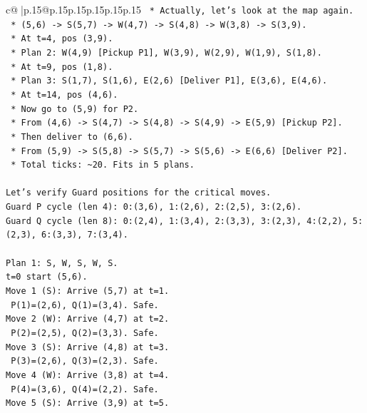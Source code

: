\documentclass{article}
\begin{document}
{\begin{supertabular}{c@{$\;$}|p{.15\linewidth}@{}p{.15\linewidth}p{.15\linewidth}p{.15\linewidth}p{.15\linewidth}p{.15\linewidth}}
{{{\texttt{    *   Actually, let's look at the map again.} \\
\texttt{    *   (5,6) {-}> S(5,7) {-}> W(4,7) {-}> S(4,8) {-}> W(3,8) {-}> S(3,9).} \\
\texttt{    *   At t=4, pos (3,9).} \\
\texttt{    *   Plan 2: W(4,9) {[}Pickup P1{]}, W(3,9), W(2,9), W(1,9), S(1,8).} \\
\texttt{    *   At t=9, pos (1,8).} \\
\texttt{    *   Plan 3: S(1,7), S(1,6), E(2,6) {[}Deliver P1{]}, E(3,6), E(4,6).} \\
\texttt{    *   At t=14, pos (4,6).} \\
\texttt{    *   Now go to (5,9) for P2.} \\
\texttt{    *   From (4,6) {-}> S(4,7) {-}> S(4,8) {-}> S(4,9) {-}> E(5,9) {[}Pickup P2{]}.} \\
\texttt{    *   Then deliver to (6,6).} \\
\texttt{    *   From (5,9) {-}> S(5,8) {-}> S(5,7) {-}> S(5,6) {-}> E(6,6) {[}Deliver P2{]}.} \\
\texttt{    *   Total ticks: \textasciitilde{}20. Fits in 5 plans.} \\
\\ 
\texttt{Let's verify Guard positions for the critical moves.} \\
\texttt{Guard P cycle (len 4): 0:(3,6), 1:(2,6), 2:(2,5), 3:(2,6).} \\
\texttt{Guard Q cycle (len 8): 0:(2,4), 1:(3,4), 2:(3,3), 3:(2,3), 4:(2,2), 5:(2,3), 6:(3,3), 7:(3,4).} \\
\\ 
\texttt{Plan 1: S, W, S, W, S.} \\
\texttt{t=0 start (5,6).} \\
\texttt{Move 1 (S): Arrive (5,7) at t=1.} \\
\texttt{  P(1)=(2,6), Q(1)=(3,4). Safe.} \\
\texttt{Move 2 (W): Arrive (4,7) at t=2.} \\
\texttt{  P(2)=(2,5), Q(2)=(3,3). Safe.} \\
\texttt{Move 3 (S): Arrive (4,8) at t=3.} \\
\texttt{  P(3)=(2,6), Q(3)=(2,3). Safe.} \\
\texttt{Move 4 (W): Arrive (3,8) at t=4.} \\
\texttt{  P(4)=(3,6), Q(4)=(2,2). Safe.} \\
\texttt{Move 5 (S): Arrive (3,9) at t=5.} \\
}}}
\end{supertabular}}
\end{document}
